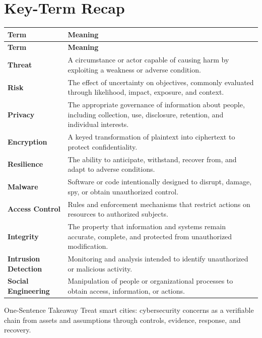 \documentclass[11pt,letterpaper]{article}
\begin{document}
\section*{Key-Term Recap}
\begin{longtable}{>{\raggedright\arraybackslash}p{}>{\raggedright\arraybackslash}p{}}
\toprule\rowcolor{Navy}\color{white}\textbf{Term} & \color{white}\textbf{Meaning}\\\midrule
\endfirsthead
\toprule\rowcolor{Navy}\color{white}\textbf{Term} & \color{white}\textbf{Meaning}\\\midrule
\endhead
\textbf{Threat} & A circumstance or actor capable of causing harm by exploiting a weakness or adverse condition. \\\midrule
\textbf{Risk} & The effect of uncertainty on objectives, commonly evaluated through likelihood, impact, exposure, and context. \\\midrule
\textbf{Privacy} & The appropriate governance of information about people, including collection, use, disclosure, retention, and individual interests. \\\midrule
\textbf{Encryption} & A keyed transformation of plaintext into ciphertext to protect confidentiality. \\\midrule
\textbf{Resilience} & The ability to anticipate, withstand, recover from, and adapt to adverse conditions. \\\midrule
\textbf{Malware} & Software or code intentionally designed to disrupt, damage, spy, or obtain unauthorized control. \\\midrule
\textbf{Access Control} & Rules and enforcement mechanisms that restrict actions on resources to authorized subjects. \\\midrule
\textbf{Integrity} & The property that information and systems remain accurate, complete, and protected from unauthorized modification. \\\midrule
\textbf{Intrusion Detection} & Monitoring and analysis intended to identify unauthorized or malicious activity. \\\midrule
\textbf{Social Engineering} & Manipulation of people or organizational processes to obtain access, information, or actions. \\\midrule
\bottomrule
\end{longtable}
\begin{CornellExamBox}{One-Sentence Takeaway}
Treat smart cities: cybersecurity concerns as a verifiable chain from assets and assumptions through controls, evidence, response, and recovery.
\end{CornellExamBox}
\end{document}
